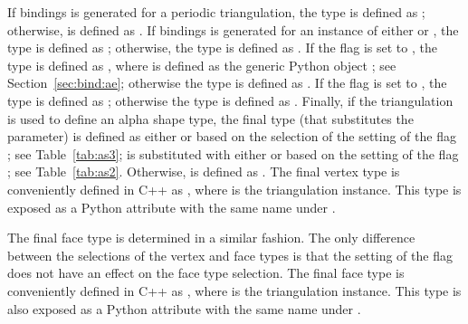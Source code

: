 If bindings is generated for a periodic triangulation, the type  is defined as
; otherwise,  is defined as .
%
If bindings is generated for an instance of either  or , the type  is defined as ; otherwise, the type  is defined as .
%
If the \cmake{} flag  is set to , the type  is defined as , where  is defined as the generic Python object ; see Section~\ref{sec:bind:ae}; otherwise the type  is defined as .
%
If the \cmake{} flag  is set to , the type  is defined as ; otherwise the type  is defined as .
%
Finally, if the triangulation is used to define an alpha shape type, the final type  (that substitutes the  parameter) is defined as either
 or
 based on the selection of the setting of the \cmake{} flag ; see Table~\ref{tab:as3};
 is substituted with either  or  based on the setting of the \cmake{} flag ; see Table~\ref{tab:as2}. Otherwise,  is defined as .
%
The final vertex type is conveniently defined in C++ as , where  is the triangulation instance. This type is exposed as a Python attribute
with the same name under .

The final face type is determined in a similar fashion. The only difference between the selections of the vertex and face types is that the setting of the \cmake{} flag  does not have an effect on the face type selection. The final face type is conveniently defined in C++ as , where  is the triangulation instance. This type is also exposed as a Python attribute with the same name under .

